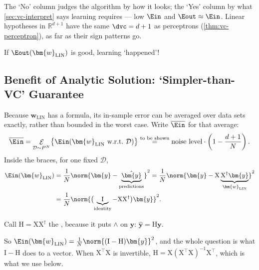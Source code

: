 The `No' column judges the algorithm by how it looks; the `Yes' column by what
\autoref{sec:vc-interpret} says learning requires --- low \(\Ein\) and \(\Eout
\approx \Ein\). Linear hypotheses in \(\mathbb{R}^{d+1}\) have the same
\(\dvc = d + 1\) as perceptrons (\autoref{thm:vc-perceptron}), as far as their
sign patterns go.

\begin{moral}
    If \(\Eout(\bm{w}_{\mathrm{LIN}})\) is good, learning `happened'!
\end{moral}

\subsection{Benefit of Analytic Solution: `Simpler-than-VC' Guarantee}

Because \(\bm{w}_{\mathrm{LIN}}\) has a formula, its in-sample error can be
averaged over data sets exactly, rather than bounded in the worst case. Write
\(\overline{\Ein}\) for that average:
\[
    \overline{\Ein} = \mathop{\mathcal{E}}_{\mathcal{D} \sim P^N} \bigl\{
    \Ein(\bm{w}_{\mathrm{LIN}} \text{ w.r.t.\ } \mathcal{D}) \bigr\}
    \overset{\text{to be shown}}{=}
    \text{noise level} \cdot \left( 1 - \frac{d+1}{N} \right) .
\]
Inside the braces, for one fixed \(\mathcal{D}\),
\begin{align*}
    \Ein(\bm{w}_{\mathrm{LIN}})
    &= \frac{1}{N} \norm{\bm{y} - \underbrace{\hat{\bm{y}}}_{\text{predictions}}}^2
    = \frac{1}{N} \norm{\bm{y} - \mathrm{X} \underbrace{\mathrm{X}^\dagger
    \bm{y}}_{\bm{w}_{\mathrm{LIN}}}}^2\\
    &= \frac{1}{N} \norm{\bigl( \underbrace{\mathrm{I}}_{\text{identity}} -
    \mathrm{X} \mathrm{X}^\dagger \bigr) \bm{y}}^2 .
\end{align*}

\begin{definition}\label{def:hat}
    Call \(\mathrm{H} = \mathrm{X} \mathrm{X}^\dagger\) the ,
    because it puts \(\wedge\) on \(\bm{y}\): \(\hat{\bm{y}} = \mathrm{H}
    \bm{y}\).
\end{definition}

So \(\Ein(\bm{w}_{\mathrm{LIN}}) = \frac{1}{N} \norm{(\mathrm{I} -
\mathrm{H}) \bm{y}}^2\), and the whole question is what \(\mathrm{I} -
\mathrm{H}\) does to a vector. When \(\mathrm{X}^\top \mathrm{X}\) is
invertible, \(\mathrm{H} = \mathrm{X} (\mathrm{X}^\top \mathrm{X})^{-1}
\mathrm{X}^\top\), which is what we use below.

